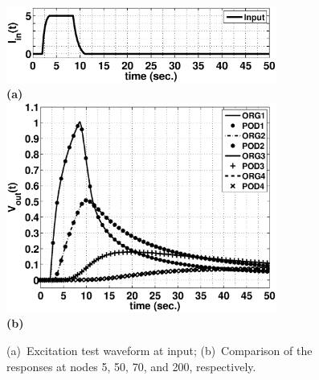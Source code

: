 \documentclass[12pt,oneside]{article}
\begin{document}
%
%
\begin{figure}[!ht]
\centering
\includegraphics[trim=0in 0in 0in 0in, clip=true, keepaspectratio=true, width=21pc]{Figs/EX2_Iin.eps}  
\\{\small \textbf{(a)}} \\
\includegraphics[trim=0in 0in 0in 0in, clip=true, keepaspectratio=true, width=21pc]{Figs/EX2_resp.eps} 
\\{\small \textbf{(b)}} \\
\caption{(a)~Excitation test waveform at input; (b)~Comparison of the responses at nodes 5, 50, 70, and 200, respectively.}
\label{fig:3}
\end{figure} %
%
\newpage
\end{document}
